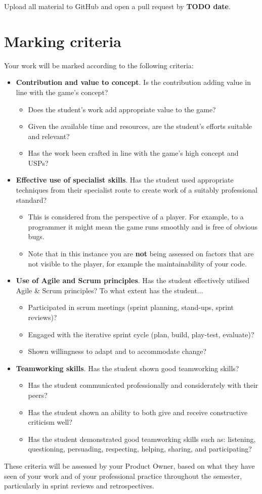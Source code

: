 \documentclass{../../fal_assignment}
\begin{document}
Upload all material to GitHub and open a pull request
by \textbf{TODO date}.

\section*{Marking criteria}

Your work will be marked according to the following criteria:
\begin{itemize}
	\item \textbf{Contribution and value to concept}. Is the contribution adding value in line with the game's concept?
		\begin{itemize}
			\item Does the student's work add appropriate value to the game?
			\item Given the available time and resources, are the student's efforts suitable and relevant?
			\item Has the work been crafted in line with the game's high concept and USPs?
		\end{itemize}
	\item \textbf{Effective use of specialist skills}. Has the student used appropriate techniques from their specialist route to create work of a suitably professional standard?
		\begin{itemize}
			\item This is considered from the perspective of a player. For example, to a programmer it might mean the game runs smoothly and is free of obvious bugs.
			\item Note that in this instance you are \textbf{not} being assessed on factors that are not visible
to the player, for example the maintainability of your code.
		\end{itemize}
	\item \textbf{Use of Agile and Scrum principles}. Has the student effectively utilised Agile \& Scrum principles?
		To what extent has the student...
		\begin{itemize}
			\item  Participated in scrum meetings (sprint planning, stand-ups, sprint reviews)?
			\item  Engaged with the iterative sprint cycle (plan, build, play-test, evaluate)?
			\item  Shown willingness to adapt and to accommodate change?
		\end{itemize}
	\item \textbf{Teamworking skills}. Has the student shown good teamworking skills?
		\begin{itemize}
			\item  Has the student communicated professionally and considerately with their peers?
			\item  Has the student shown an ability to both give and receive constructive criticism well?
			\item  Has the student demonstrated good teamworking skills such as: listening, questioning,
			persuading, respecting, helping, sharing, and participating?
		\end{itemize}
\end{itemize}

These criteria will be assessed by your Product Owner, based on what they have seen of your work
and of your professional practice throughout the semester,
particularly in sprint reviews and retrospectives.
\end{document}
